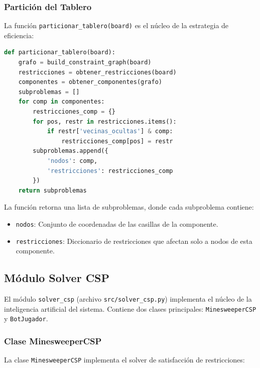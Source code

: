 \documentclass[12pt,a4paper]{article}
\begin{document}
\subsubsection{Partición del Tablero}

La función \texttt{particionar\_tablero(board)} es el núcleo de la estrategia de eficiencia:

\begin{lstlisting}[language=Python, caption={Partición del tablero en subproblemas independientes.}]
def particionar_tablero(board):
    grafo = build_constraint_graph(board)
    restricciones = obtener_restricciones(board)
    componentes = obtener_componentes(grafo)
    subproblemas = []
    for comp in componentes:
        restricciones_comp = {}
        for pos, restr in restricciones.items():
            if restr['vecinas_ocultas'] & comp:
                restricciones_comp[pos] = restr
        subproblemas.append({
            'nodos': comp,
            'restricciones': restricciones_comp
        })
    return subproblemas
\end{lstlisting}

La función retorna una lista de subproblemas, donde cada subproblema contiene:
\begin{itemize}[itemsep=2pt]
    \item \texttt{nodos}: Conjunto de coordenadas de las casillas de la componente.
    \item \texttt{restricciones}: Diccionario de restricciones que afectan solo a nodos de esta componente.
\end{itemize}

\subsection{Módulo Solver CSP}

El módulo \texttt{solver\_csp} (archivo \texttt{src/solver\_csp.py}) implementa el núcleo de la inteligencia artificial del sistema. Contiene dos clases principales: \texttt{MinesweeperCSP} y \texttt{BotJugador}.

\subsubsection{Clase MinesweeperCSP}

La clase \texttt{MinesweeperCSP} implementa el solver de satisfacción de restricciones:
\end{document}
